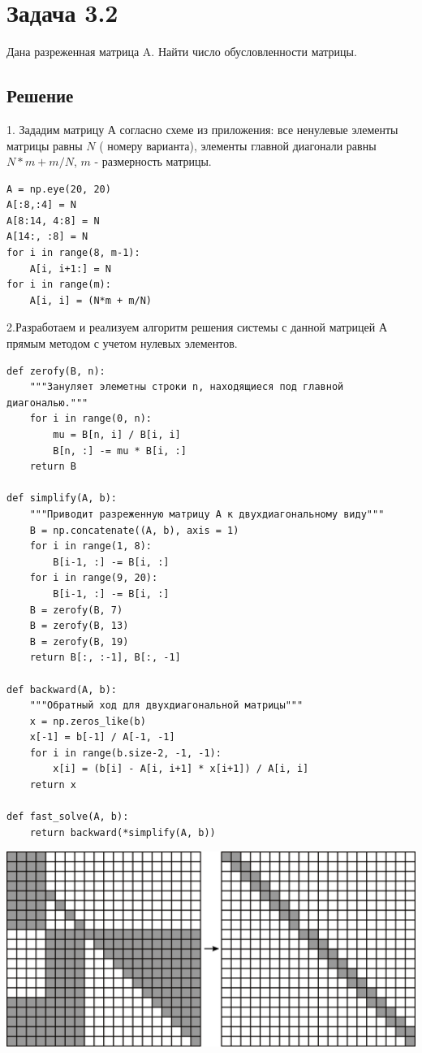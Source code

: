 \section*{Задача 3.2}
Дана разреженная матрица A. Найти число обусловленности матрицы.

\subsection*{Решение}
1. Зададим матрицу А согласно схеме из приложения: все ненулевые элементы матрицы равны $N$ ( номеру варианта), элементы главной диагонали равны  $N*m+m/N$,  $m$ - размерность матрицы.


\begin{verbatim}
A = np.eye(20, 20)
A[:8,:4] = N
A[8:14, 4:8] = N
A[14:, :8] = N
for i in range(8, m-1):
    A[i, i+1:] = N
for i in range(m):
    A[i, i] = (N*m + m/N)
\end{verbatim}

2.Разработаем и реализуем алгоритм решения системы с данной матрицей $А$ прямым методом с учетом нулевых элементов.
\begin{verbatim}
def zerofy(B, n):
    """Зануляет элеметны строки n, находящиеся под главной диагональю."""
    for i in range(0, n):
        mu = B[n, i] / B[i, i]
        B[n, :] -= mu * B[i, :]
    return B

def simplify(A, b):
    """Приводит разреженную матрицу А к двухдиагональному виду"""
    B = np.concatenate((A, b), axis = 1)
    for i in range(1, 8):
        B[i-1, :] -= B[i, :]
    for i in range(9, 20):
        B[i-1, :] -= B[i, :]
    B = zerofy(B, 7)
    B = zerofy(B, 13)
    B = zerofy(B, 19)
    return B[:, :-1], B[:, -1]

def backward(A, b):
    """Обратный ход для двухдиагональной матрицы"""
    x = np.zeros_like(b)
    x[-1] = b[-1] / A[-1, -1]
    for i in range(b.size-2, -1, -1):
        x[i] = (b[i] - A[i, i+1] * x[i+1]) / A[i, i]
    return x

def fast_solve(A, b):
    return backward(*simplify(A, b))
\end{verbatim}

\includegraphics[width=15cm]{matr.png}

